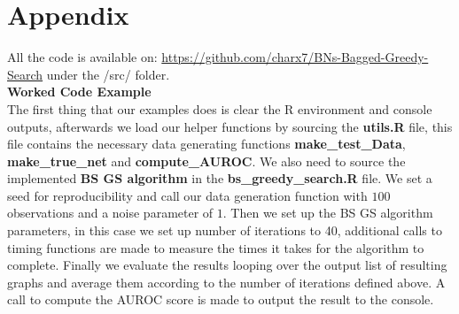 \documentclass{article}
\begin{document}
	\section*{Appendix}
	All the code is available 
	on: \url{
	https://github.com/charx7/BNs-Bagged-Greedy-Search} under the /src/ folder.
	\\
	\textbf{Worked Code Example}	
	\\
	The first thing that our examples does is clear the R environment and console
	outputs, afterwards we load our helper functions by sourcing the
	\textbf{utils.R} file, this file contains the necessary data generating
	functions \textbf{make\_test\_Data}, \textbf{make\_true\_net} and \textbf{compute\_AUROC}. We also need
	to source the implemented \textbf{BS GS algorithm} in the
	\textbf{bs\_greedy\_search.R} file. We set a seed for reproducibility and
	call our data generation function with $100$ observations and a noise
	parameter of $1$. Then we set up the BS GS algorithm parameters, in this case
	we set up number of iterations to 40, additional calls to timing functions
	are made to measure the times it takes for the algorithm to complete. Finally
	we evaluate the results looping over the output list of resulting graphs and
	average them according to the number of iterations defined above. A call to
	compute the AUROC score is made to output the result to the console.
	
	
	
	

	
	
\end{document}
